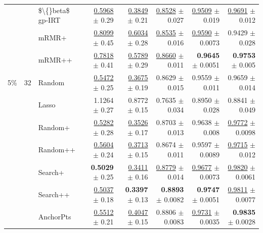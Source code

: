 \begin{longtable}{llp{}rrrrr}
 &  & \$\textbackslash\{\}beta\$ gp-IRT & \underline{0.5968} {\scriptsize $\pm$ 0.29} & \underline{0.3849} {\scriptsize $\pm$ 0.21} & \underline{0.8528} {\scriptsize $\pm$ 0.027} & \underline{0.9509} {\scriptsize $\pm$ 0.019} & \underline{0.9691} {\scriptsize $\pm$ 0.012} \\
 &  & mRMR+ & \underline{0.8099} {\scriptsize $\pm$ 0.45} & \underline{0.6034} {\scriptsize $\pm$ 0.28} & \underline{0.8535} {\scriptsize $\pm$ 0.016} & \underline{0.9590} {\scriptsize $\pm$ 0.0073} & 0.9429 {\scriptsize $\pm$ 0.028} \\
 &  & mRMR++ & \underline{0.7818} {\scriptsize $\pm$ 0.41} & \underline{0.5789} {\scriptsize $\pm$ 0.29} & \underline{0.8660} {\scriptsize $\pm$ 0.011} & \textbf{0.9645} {\scriptsize $\pm$ 0.0051} & \textbf{0.9753} {\scriptsize $\pm$ 0.005} \\
\midrule
5\% & 32 & Random & \underline{0.5472} {\scriptsize $\pm$ 0.25} & \underline{0.3675} {\scriptsize $\pm$ 0.19} & 0.8629 {\scriptsize $\pm$ 0.015} & 0.9559 {\scriptsize $\pm$ 0.011} & 0.9659 {\scriptsize $\pm$ 0.014} \\
 &  & Lasso & 1.1264 {\scriptsize $\pm$ 0.27} & 0.8772 {\scriptsize $\pm$ 0.15} & 0.7635 {\scriptsize $\pm$ 0.034} & 0.8950 {\scriptsize $\pm$ 0.028} & 0.8841 {\scriptsize $\pm$ 0.049} \\
 &  & Random+ & \underline{0.5282} {\scriptsize $\pm$ 0.28} & \underline{0.3526} {\scriptsize $\pm$ 0.17} & 0.8703 {\scriptsize $\pm$ 0.013} & 0.9638 {\scriptsize $\pm$ 0.008} & \underline{0.9772} {\scriptsize $\pm$ 0.0098} \\
 &  & Random++ & \underline{0.5604} {\scriptsize $\pm$ 0.24} & \underline{0.3713} {\scriptsize $\pm$ 0.15} & 0.8674 {\scriptsize $\pm$ 0.011} & 0.9597 {\scriptsize $\pm$ 0.0089} & \underline{0.9715} {\scriptsize $\pm$ 0.012} \\
 &  & Search+ & \textbf{0.5029} {\scriptsize $\pm$ 0.25} & \underline{0.3411} {\scriptsize $\pm$ 0.16} & \underline{0.8779} {\scriptsize $\pm$ 0.014} & \underline{0.9677} {\scriptsize $\pm$ 0.0073} & \underline{0.9820} {\scriptsize $\pm$ 0.0061} \\
 &  & Search++ & \underline{0.5037} {\scriptsize $\pm$ 0.18} & \textbf{0.3397} {\scriptsize $\pm$ 0.13} & \textbf{0.8893} {\scriptsize $\pm$ 0.0082} & \textbf{0.9747} {\scriptsize $\pm$ 0.0051} & \underline{0.9811} {\scriptsize $\pm$ 0.0077} \\
 &  & AnchorPts & \underline{0.5512} {\scriptsize $\pm$ 0.21} & \underline{0.4047} {\scriptsize $\pm$ 0.15} & 0.8806 {\scriptsize $\pm$ 0.0083} & \underline{0.9731} {\scriptsize $\pm$ 0.0035} & \textbf{0.9835} {\scriptsize $\pm$ 0.0028} \\

\end{longtable}
